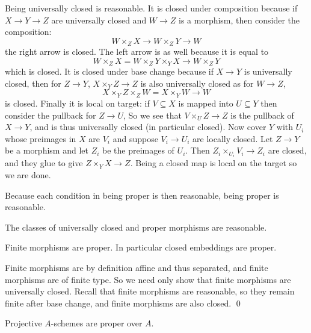 Being universally closed is reasonable.
It is closed under composition because if $X\to Y\to Z$ are universally closed and $W\to Z$ is a morphism,
then consider the composition:
$$ W\times_ZX \to W\times_ZY \to W $$
the right arrow is closed.
The left arrow is as well because it is equal to
$$ W\times_ZX = W\times_ZY\times_YX \to W\times_ZY $$
which is closed.
It is closed under base change because if $X\to Y$ is universally closed, then for $Z\to Y$,
$X\times_YZ\to Z$ is also universally closed as for $W\to Z$,
$$ X\times_YZ\times_ZW = X\times_YW \to W $$
is closed.
Finally it is local on target: if $V\subseteq X$ is mapped into $U\subseteq Y$ then consider the pullback
for $Z\to U$,
So we see that $V\times_UZ\to Z$ is the pullback of $X\to Y$, and is thus universally closed (in particular
closed).
Now cover $Y$ with $U_i$ whose preimages in $X$ are $V_i$ and suppose $V_i\to U_i$ are locally closed.
Let $Z\to Y$ be a morphism and let $Z_i$ be the preimages of $U_i$.
Then $Z_i\times_{U_i}V_i\to Z_i$ are closed, and they glue to give $Z\times_YX\to Z$.
Being a closed map is local on the target so we are done.

Because each condition in being proper is then reasonable, being proper is reasonable.

\bprop

    The classes of universally closed and proper morphisms are reasonable.

\eprop

\bprop

    Finite morphisms are proper.
    In particular closed embeddings are proper.

\eprop

\bproof

    Finite morphisms are by definition affine and thus separated, and finite morphisms are of finite type.
    So we need only show that finite morphisms are universally closed.
    Recall that finite morphisms are reasonable, so they remain finite after base change, and finite
    morphisms are also closed.
    \qed

\eproof

\bthrm

    Projective $A$-schemes are proper over $A$.

